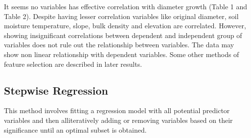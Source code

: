 \documentclass[
]{article}
\begin{document}
It seems no variables has effective correlation with diameter growth
(Table 1 and Table 2). Despite having lesser correlation variables like
original diameter, soil moisture temperature, slope, bulk density and
elevation are correlated. However, showing insignificant correlations
between dependent and independent group of variables does not rule out
the relationship between variables. The data may show non linear
relationship with dependent variables. Some other methods of feature
selection are described in later results.

\hypertarget{stepwise-regression}{%
\subsection{Stepwise Regression}\label{stepwise-regression}}

This method involves fitting a regression model with all potential
predictor variables and then alliteratively adding or removing variables
based on their significance until an optimal subset is obtained.
\end{document}
